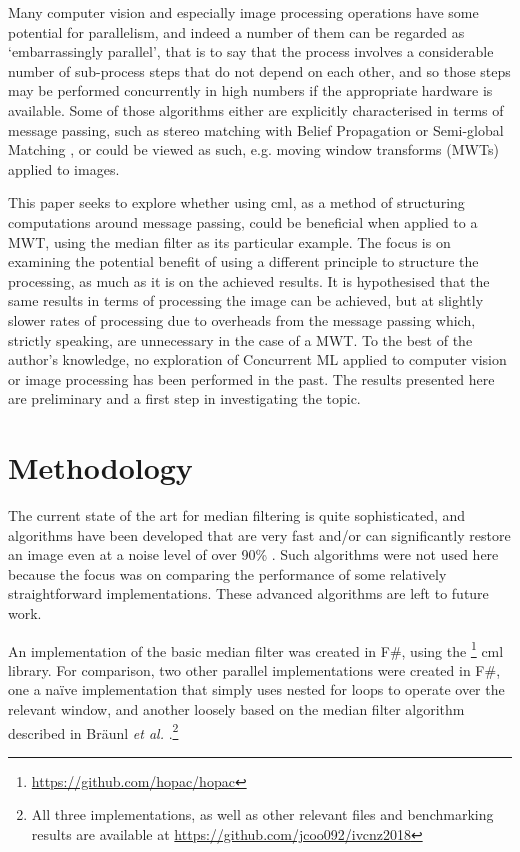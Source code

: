 Many computer vision and especially image processing operations have some potential for parallelism, and indeed a number of them can be regarded as `embarrassingly parallel', that is to say that the process involves a considerable number of sub-process steps that do not depend on each other, and so those steps may be performed concurrently in high numbers if the appropriate hardware is available.  Some of those algorithms either are explicitly characterised in terms of message passing, such as stereo matching with Belief Propagation \cite{Liang2011} or Semi-global Matching \cite{Drory2014}, or could be viewed as such, e.g. moving window transforms (MWTs) applied to images.

This paper seeks to explore whether using \gls{cml}, as a method of structuring computations around message passing, could be beneficial when applied to a MWT, using the median filter as its particular example.  The focus is on examining the potential benefit of using a different principle to structure the processing, as much as it is on the achieved results.  It is hypothesised that the same results in terms of processing the image can be achieved, but at slightly slower rates of processing due to overheads from the message passing which, strictly speaking, are unnecessary in the case of a MWT. To the best of the author's knowledge, no exploration of Concurrent ML applied to computer vision or image processing has been performed in the past.  The results presented here are preliminary and a first step in investigating the topic.

\section{Methodology}

The current state of the art for median filtering is quite sophisticated, and algorithms have been developed that are very fast \cite{Sanchez2012,Perrot2014} and/or can significantly restore an image even at a noise level of over 90\% \cite{Gao2015,Wu2011}.  Such algorithms were not used here because the focus was on comparing the performance of some relatively straightforward implementations.  These advanced algorithms are left to future work.

An implementation of the basic median filter was created in F\#, using the \hopac{}\footnote{\url{https://github.com/hopac/hopac}} \gls{cml} library.  For comparison, two other parallel implementations were created in F\#, one a na\"{i}ve implementation that simply uses nested for loops to operate over the relevant window, and another loosely based on the median filter algorithm described in Br\"{a}unl \textit{et al.} \cite{Braunl2001}.\footnote{All three implementations, as well as other relevant files and benchmarking results are available at \url{https://github.com/jcoo092/ivcnz2018}}

